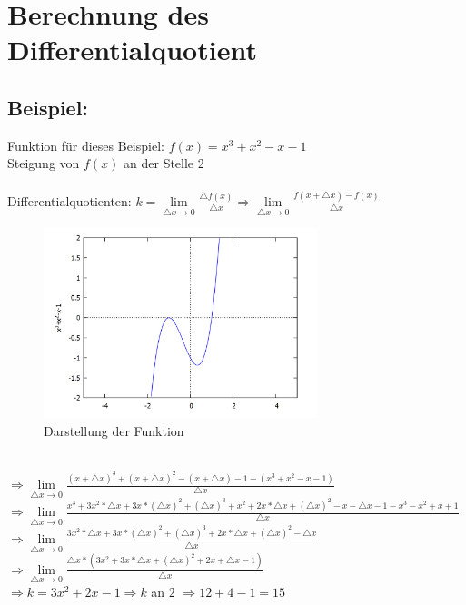 \documentclass[../mainfile.tex]{subfiles}
\begin{document}
	\section{Berechnung des Differentialquotient}
	\subsection*{Beispiel:}
	Funktion für dieses Beispiel: $f(x) = x^{3} + x^{2} - x - 1$\\
	Steigung von $f(x)$ an der Stelle 2\\
	\\
	Differentialquotienten: $k = \lim\limits_{\triangle x \rightarrow 0}{\frac{\triangle f(x)}{\triangle x}} \Rightarrow \lim\limits_{\triangle x \rightarrow 0}{\frac{f(x+\triangle x)-f(x)}{\triangle x}}$
	\begin{figure}[h] 
		\centering
		\includegraphics[width=8cm]{./swahl/img/graph2.jpg}
		\caption{Darstellung der Funktion}
	\end{figure}
	\\
	$\Rightarrow \lim\limits_{\triangle x \rightarrow 0}{\frac{(x+ \triangle x)^{3} + (x + \triangle x)^{2} - (x+ \triangle x) - 1 - (x^{3} + x^{2} - x - 1)}{\triangle x}}$\\
	$\Rightarrow \lim\limits_{\triangle x \rightarrow 0}{\frac{x^{3}+3x^{2}*\triangle x + 3x*(\triangle x)^{2} + (\triangle x)^{3}+ x^{2} + 2x*\triangle x + (\triangle x)^{2} - x - \triangle x -1 -x^{3} - x^{2} + x + 1 }{\triangle x}}$
	\\
	$\Rightarrow \lim\limits_{\triangle x \rightarrow 0}{\frac{3x^{2} * \triangle x + 3x * (\triangle x)^{2} + (\triangle x)^{3} + 2x * \triangle x + (\triangle x)^{2} - \triangle x}{\triangle x}}$
	\\
	$\Rightarrow \lim\limits_{\triangle x \rightarrow 0}{\frac{\triangle x * (3x^{2} + 3x * \triangle x + (\triangle x)^{2} + 2x+ \triangle x - 1) }{\triangle x}}$
	\\
	$\Rightarrow k = 3x^{2} + 2x - 1 \Rightarrow k$ an $2$ $\Rightarrow 12 + 4 - 1 = 15$
\end{document}
